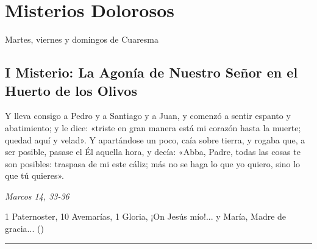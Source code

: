 \documentclass[./rosary.tex]{subfiles}
\begin{document}
\section*{Misterios Dolorosos}
Martes, viernes y domingos de Cuaresma

\subsection*{I Misterio: La Agonía de Nuestro Señor en el Huerto de los Olivos}

Y lleva consigo a Pedro y a Santiago y a Juan, y comenzó a sentir espanto y abatimiento; y le dice:
«triste en gran manera está mi corazón hasta la muerte; quedad aquí y velad». Y apartándose un poco,
caía sobre tierra, y rogaba que, a ser posible, pasase el Él aquella hora, y decía: «Abba, Padre, todas las cosas te son posibles:
traspasa de mi este cáliz; más no se haga lo que yo quiero, sino lo que tú quieres».

\begin{flushright}
    \emph{Marcos 14, 33-36}
\end{flushright}

1 Paternoster, 10 Avemarías, 1 Gloria, ¡On Jesús mío!... y María, Madre de gracia... ()

\rule{\textwidth}{0.5pt}
\end{document}
